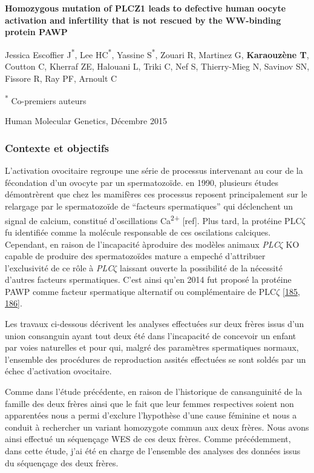 \documentclass[12pt,twoside]{reedthesis}
\theoremstyle{definition}
\theoremstyle{definition}
\theoremstyle{remark}
\begin{document}
  \textbf{Homozygous mutation of PLCZ1 leads to defective human oocyte
  activation and infertility that is not rescued by the WW-binding protein
  PAWP}
  
  Jessica Escoffier J\textsuperscript{*}, Lee HC\textsuperscript{*},
  Yassine S\textsuperscript{*}, Zouari R, Martinez G, \textbf{Karaouzène
  T}, Coutton C, Kherraf ZE, Halouani L, Triki C, Nef S, Thierry-Mieg N,
  Savinov SN, Fissore R, Ray PF, Arnoult C
  
  \textsuperscript{*} Co-premiers auteurs
  
  Human Molecular Genetics, Décembre 2015
  
  \newpage
  
  \subsubsection{Contexte et objectifs}\label{contexte-et-objectifs-3}
  
  L'activation ovocitaire regroupe une série de processus intervenant au
  cour de la fécondation d'un ovocyte par un spermatozoïde. en 1990,
  plusieurs études démontrèrent que chez les mamifères ces processus
  reposent principalement sur le relargage par le spermatozoïde de
  ``facteurs spermatiques'' qui déclenchent un signal de calcium,
  constitué d'oscillations Ca\textsuperscript{2+} {[}ref{]}. Plus tard, la
  protéine PLC\(\zeta\) fu identifiée comme la molécule responsable de ces
  oscilations calciques. Cependant, en raison de l'incapacité àproduire
  des modèles animaux \emph{PLC}\(\zeta\) KO capable de produire des
  spermatozoïdes mature a empeché d'attribuer l'exclusivité de ce rôle à
  \emph{PLC}\(\zeta\) laissant ouverte la possibilité de la nécessité
  d'autres facteurs spermatiques. C'est ainsi qu'en 2014 fut proposé la
  protéine PAWP comme facteur spermatique alternatif ou complémentaire de
  PLC\(\zeta\) {[}\protect\hyperlink{ref-Aarabi2014}{185},
  \protect\hyperlink{ref-Aarabi2014a}{186}{]}.
  
  Les travaux ci-dessous décrivent les analyses effectuées sur deux frères
  issus d'un union consanguin ayant tout deux été dans l'incapacité de
  concevoir un enfant par voies naturelles et pour qui, malgré des
  paramètres spermatiques normaux, l'ensemble des procédures de
  reproduction assités effectuées se sont soldés par un échec d'activation
  ovocitaire.
  
  Comme dans l'étude précédente, en raison de l'historique de
  cansanguinité de la famille des deux frères ainsi que le fait que leur
  femmes respectives soient non apparentées nous a permi d'exclure
  l'hypothèse d'une cause féminine et nous a conduit à rechercher un
  variant homozygote commun aux deux frères. Nous avons ainsi effectué un
  séquençage WES de ces deux frères. Comme précédemment, dans cette étude,
  j'ai été en charge de l'ensemble des analyses des données issus du
  séquençage des deux frères.
  
\end{document}
